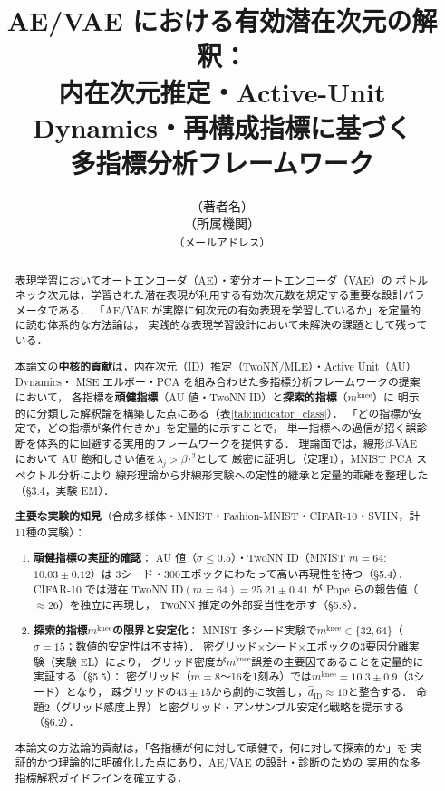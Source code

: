 \documentclass[11pt,a4paper]{jsarticle}
\title{AE/VAE における有効潜在次元の解釈：\\
       内在次元推定・Active-Unit Dynamics・再構成指標に基づく\\
       多指標分析フレームワーク}
\author{（著者名）\\
{\small （所属機関）}\\
{\small \texttt{（メールアドレス）}}}
\date{}
\newcommand{\mknee}{m^{\mathrm{knee}}}
\begin{document}
\maketitle

\begin{abstract}
表現学習においてオートエンコーダ（AE）・変分オートエンコーダ（VAE）の
ボトルネック次元は，学習された潜在表現が利用する有効次元数を規定する重要な設計パラメータである．
「AE/VAE が実際に何次元の有効表現を学習しているか」を定量的に読む体系的な方法論は，
実践的な表現学習設計において未解決の課題として残っている．

本論文の\textbf{中核的貢献}は，内在次元（ID）推定（TwoNN/MLE）・Active Unit（AU）Dynamics・
MSE エルボー・PCA を組み合わせた多指標分析フレームワークの提案において，
各指標を\textbf{頑健指標}（AU 値・TwoNN ID）と\textbf{探索的指標}（$\mknee$）に
明示的に分類した解釈論を構築した点にある（表\ref{tab:indicator_class}）．
「どの指標が安定で，どの指標が条件付きか」を定量的に示すことで，
単一指標への過信が招く誤診断を体系的に回避する実用的フレームワークを提供する．
理論面では，線形$\beta$-VAE において AU 飽和しきい値を$\lambda_j > \beta\tau^2$として
厳密に証明し（定理1），MNIST PCA スペクトル分析により
線形理論から非線形実験への定性的継承と定量的乖離を整理した（§3.4，実験 EM）．

\textbf{主要な実験的知見}（合成多様体・MNIST・Fashion-MNIST・CIFAR-10・SVHN，計11種の実験）：
\begin{enumerate}
  \item \textbf{頑健指標の実証的確認}：
        AU 値（$\sigma \leq 0.5$）・TwoNN ID（MNIST $m=64$: $10.03 \pm 0.12$）は
        3シード・300エポックにわたって高い再現性を持つ（§5.4）．
        CIFAR-10 では潜在 TwoNN ID$(m=64)=25.21\pm0.41$ が Pope らの報告値（$\approx26$）を独立に再現し，
        TwoNN 推定の外部妥当性を示す（§5.8）．
  \item \textbf{探索的指標$\mknee$の限界と安定化}：
        MNIST 多シード実験で$\mknee \in \{32, 64\}$（$\sigma=15$；数値的安定性は不支持）．
        密グリッド×シード×エポックの3要因分離実験（実験 EL）により，
        グリッド密度が$\mknee$誤差の主要因であることを定量的に実証する（§5.5）：
        密グリッド（$m=8$〜16を1刻み）では$\mknee = 10.3 \pm 0.9$（3シード）となり，
        疎グリッドの$43\pm15$から劇的に改善し，$\hat{d}_\mathrm{ID} \approx 10$と整合する．
        命題2（グリッド感度上界）と密グリッド・アンサンブル安定化戦略を提示する（§6.2）．
\end{enumerate}

本論文の方法論的貢献は，「各指標が何に対して頑健で，何に対して探索的か」を
実証的かつ理論的に明確化した点にあり，AE/VAE の設計・診断のための
実用的な多指標解釈ガイドラインを確立する．
\end{abstract}
\end{document}
